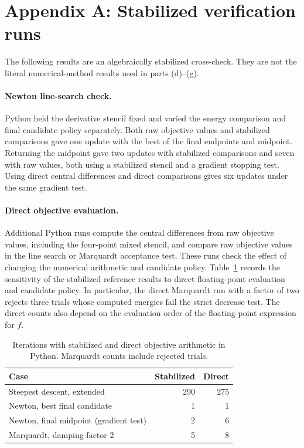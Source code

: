 \documentclass[11pt,a4paper]{article}
\begin{document}
\clearpage\section{Appendix A: Stabilized verification runs}\label{app:stable}
The following results are an algebraically stabilized cross-check. They are not the literal numerical-method results used in parts (d)--(g).
\paragraph{Newton line-search check.} Python held the derivative stencil
fixed and varied the energy comparison and final candidate policy separately.
Both raw objective values and stabilized comparisons gave one update with
the best of the final endpoints and midpoint. Returning the midpoint gave
two updates with stabilized comparisons and seven with raw values, both
using a stabilized stencil and a gradient stopping test. Using direct
central differences and direct comparisons gives six updates under the
same gradient test.

\paragraph{Direct objective evaluation.} Additional Python runs compute the
central differences from raw objective values, including the four-point
mixed stencil, and compare raw objective values in the line search or
Marquardt acceptance test. These runs check the effect of changing the numerical arithmetic and candidate policy.
Table~\ref{tab:arithmetic} records the sensitivity of the stabilized reference
results to direct floating-point evaluation and candidate policy. In particular, the
direct Marquardt run with a factor of two rejects three trials whose computed
energies fail the strict decrease test. The direct counts also depend on
the evaluation order of the floating-point expression for $f$.

\begin{table}[H]
\centering
\caption{Iterations with stabilized and direct objective arithmetic in Python.
Marquardt counts include rejected trials.}
\label{tab:arithmetic}
\begin{tabular}{lrr}
\toprule
Case & Stabilized & Direct\\
\midrule
Steepest descent, extended & 290 & 275\\
Newton, best final candidate & 1 & 1\\
Newton, final midpoint (gradient test) & 2 & 6\\
Marquardt, damping factor 2 & 5 & 8\\
\bottomrule
\end{tabular}
\end{table}
\end{document}
